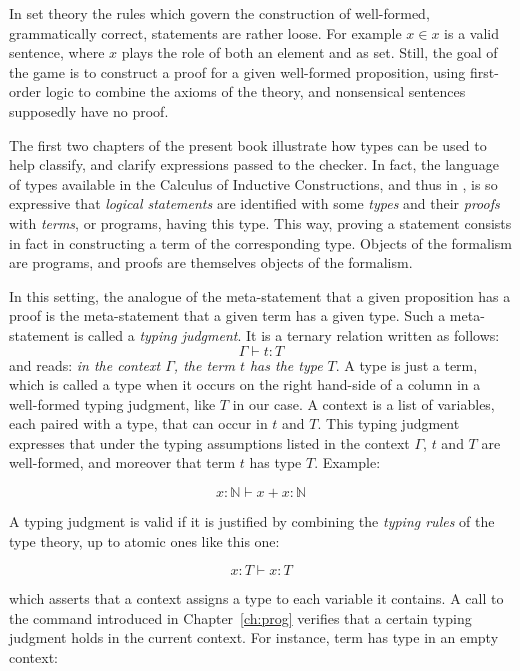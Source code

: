 In set theory the rules which govern the construction of
well-formed, grammatically correct, statements are rather loose.
For example
$x \in x$ is a valid sentence, where $x$ plays the role of
both an element and as set. Still, the
goal of the game is to construct a proof for a given well-formed
proposition, using first-order logic to combine the axioms of the
theory, and nonsensical sentences supposedly have no proof.

The first two chapters of the present book illustrate how
types can be used to help classify, and clarify expressions passed to
the checker. In fact, the language of types available in the Calculus
of Inductive Constructions, and thus in  \Coq{}, is so expressive that
\emph{logical statements} are identified with some \emph{types} and
their \emph{proofs} with \emph{terms}, or programs, having this
type. This way, proving a statement consists in fact in constructing a
term of the corresponding type. Objects of the formalism are programs,
and proofs are themselves objects of the formalism.

In this setting, the analogue of the meta-statement
that a given proposition has a proof is the meta-statement that a
given term has a given type. Such a meta-statement is called a
\emph{typing judgment}. It is a ternary relation written as follows:
$$\Gamma \vdash t : T$$
and reads:
\emph{in the context $\Gamma$, the term $t$ has the type $T$}. A type
is just a term, which is called a type when it occurs on the right
hand-side of a column in a well-formed typing judgment, like $T$ in
our case. A context is a list of variables, each paired with a type,
that can occur in $t$ and $T$. This typing judgment expresses that
under the typing assumptions listed in the context $\Gamma$, $t$ and
$T$ are well-formed, and moreover that term $t$ has type $T$. Example:

$$x : \mathbb{N} \vdash x + x : \mathbb{N}$$

A typing judgment is valid if it is justified by combining the \emph{typing rules} of the
type theory, up to atomic ones like this one:

$$x : T \vdash x : T$$

which asserts that a context assigns a type to each variable it contains.
A call to the  command introduced in Chapter~\ref{ch:prog} 
verifies that a certain typing judgment holds in the current
context. For instance, term  has type  in an empty context:

